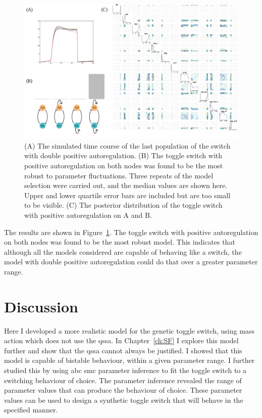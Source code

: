 \begin{figure}[htbp]
	\centerfloat
\includegraphics[scale=0.75]{../../chapters/chapterABCSysBio/images/model_sel_res-01.png}
\caption[ABC model selection resulting posterior distribution]{\label{fig:model_sel_res}(A) The simulated time course of the last population of the switch with double positive autoregulation. (B) The toggle switch with positive autoregulation on both nodes was found to be the most robust to parameter fluctuations. Three repeats of the model selection were carried out, and the median values are shown here. Upper and lower quartile error bars are included but are too small to be visible. (C) The posterior distribution of the toggle switch with positive autoregulation on A and B.}


\end{figure}
\clearpage
The results are shown in Figure~\ref{fig:model_sel_res}. The toggle switch with positive autoregulation on both nodes was found to be the most robust model. This indicates that although all the models considered are capable of behaving like a switch, the model with double positive autoregulation could do that over a greater parameter range.  



\section{Discussion}

Here I developed a more realistic model for the genetic toggle switch, using mass action which does not use the \acrshort{qssa}. In Chapter~\ref{ch:SF} I explore this model further and show that the \acrshort{qssa} cannot always be justified. I showed that this model is capable of bistable behaviour, within a given parameter range. I further studied this by using \acrshort{abc} \acrshort{smc} parameter inference to fit the toggle switch to a switching behaviour of choice. The parameter inference revealed the range of parameter values that can produce the behaviour of choice. These parameter values can be used to design a synthetic toggle switch that will behave in the specified manner. 

